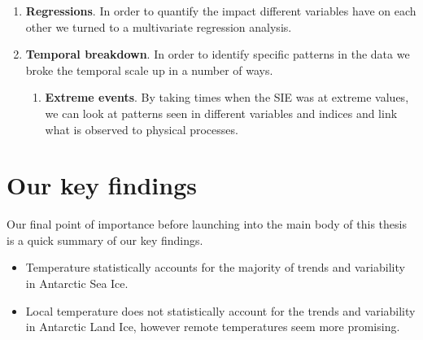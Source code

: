 \documentclass[../main.tex]{subfiles}
\begin{document}
\begin{enumerate}
\begin{enumerate}
    \end{enumerate}
    \item \todo{[WIP]} \textbf{Regressions}. In order to quantify the impact different variables have on each other we turned to a multivariate regression analysis.
    \item \todo{[WIP]} \textbf{Temporal breakdown}. In order to identify specific patterns in the data we broke the temporal scale up in a number of ways.
    \begin{enumerate}
        \item \todo{[WIP]} \textbf{Extreme events}. By taking times when the SIE was at extreme values, we can look at patterns seen in different variables and indices and link what is observed to physical processes.
    \end{enumerate}
\end{enumerate}



\section{Our key findings}
Our final point of importance before launching into the main body of this thesis is a quick summary of our key findings.
\begin{itemize}
    \item Temperature statistically accounts for the majority of trends and variability in Antarctic Sea Ice.
    \item Local temperature does not statistically account for the trends and variability in Antarctic Land Ice, however remote temperatures seem more promising.
\end{itemize}
\end{document}
